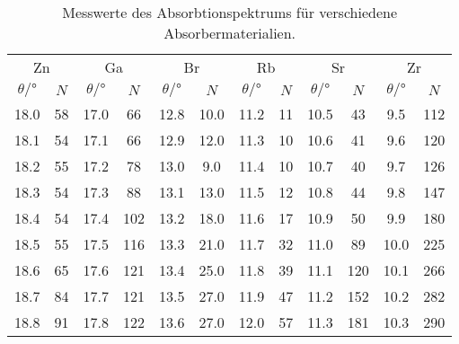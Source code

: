 \begin{table}[H]
    \centering
    \caption{Messwerte des Absorbtionspektrums für verschiedene Absorbermaterialien.}
    \begin{tabular}{c c c c c c c c c c c c}
    \toprule
    \multicolumn{2}{c}{Zn} &
    \multicolumn{2}{c}{Ga} &
    \multicolumn{2}{c}{Br} &
    \multicolumn{2}{c}{Rb} &
    \multicolumn{2}{c}{Sr} &
    \multicolumn{2}{c}{Zr}\\
    \cmidrule(lr){1-2}\cmidrule(lr){3-4}\cmidrule(lr){5-6}\cmidrule(lr){7-8}\cmidrule(lr){9-10}\cmidrule(lr){11-12}
    {$\theta /\si{\degree}$} &
    {$N$} &
    {$\theta /\si{\degree}$} &
    {$N$} &
    {$\theta /\si{\degree}$} &
    {$N$} &
    {$\theta /\si{\degree}$} &
    {$N$} &
    {$\theta /\si{\degree}$} &
    {$N$} &
    {$\theta /\si{\degree}$} &
    {$N$} \\
    \midrule
    \num{18.0} & \num{58}  &\num{17.0} & \num{66}  & \num{12.8}  & \num{10.0} & \num{11.2} & \num{11} & \num{10.5} & \num{43}  & \num{9.5}  & \num{112} \\
    \num{18.1} & \num{54}  &\num{17.1} & \num{66}  & \num{12.9}  & \num{12.0} & \num{11.3} & \num{10} & \num{10.6} & \num{41}  & \num{9.6}  & \num{120} \\
    \num{18.2} & \num{55}  &\num{17.2} & \num{78}  & \num{13.0}  & \num{9.0}  & \num{11.4} & \num{10} & \num{10.7} & \num{40}  & \num{9.7}  & \num{126} \\
    \num{18.3} & \num{54}  &\num{17.3} & \num{88}  & \num{13.1}  & \num{13.0} & \num{11.5} & \num{12} & \num{10.8} & \num{44}  & \num{9.8}  & \num{147} \\
    \num{18.4} & \num{54}  &\num{17.4} & \num{102} & \num{13.2}  & \num{18.0} & \num{11.6} & \num{17} & \num{10.9} & \num{50}  & \num{9.9}  & \num{180} \\
    \num{18.5} & \num{55}  &\num{17.5} & \num{116} & \num{13.3}  & \num{21.0} & \num{11.7} & \num{32} & \num{11.0} & \num{89}  & \num{10.0} & \num{225} \\
    \num{18.6} & \num{65}  &\num{17.6} & \num{121} & \num{13.4}  & \num{25.0} & \num{11.8} & \num{39} & \num{11.1} & \num{120} & \num{10.1} & \num{266} \\
    \num{18.7} & \num{84}  &\num{17.7} & \num{121} & \num{13.5}  & \num{27.0} & \num{11.9} & \num{47} & \num{11.2} & \num{152} & \num{10.2} & \num{282} \\
    \num{18.8} & \num{91}  &\num{17.8} & \num{122} & \num{13.6}  & \num{27.0} & \num{12.0} & \num{57} & \num{11.3} & \num{181} & \num{10.3} & \num{290} \\

\end{tabular}
\end{table}
